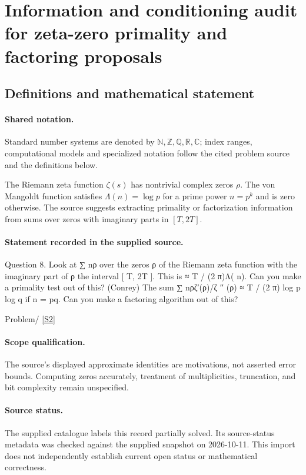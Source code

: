 \documentclass[11pt]{article}
\newcommand{\sref}[2]{\hyperlink{source:#1:#2}{[S#2]}}
\begin{document}
\section{Information and conditioning audit for zeta-zero primality and factoring proposals}\label{statement}

\subsection{Definitions and mathematical statement}

\paragraph{Shared notation.}Standard number systems are denoted by $\mathbb N,\mathbb Z,\mathbb Q,\mathbb R,\mathbb C$; index ranges, computational models and specialized notation follow the cited problem source and the definitions below.


The Riemann zeta function $\zeta(s)$ has nontrivial complex zeros $\rho$. The von Mangoldt function satisfies $\Lambda(n)=\log p$ for a prime power $n=p^k$ and is zero otherwise. The source suggests extracting primality or factorization information from sums over zeros with imaginary parts in $[T,2T]$.
\paragraph{Statement recorded in the supplied source.}
Question 8. Look at ∑ nρ over the zeros ρ of the Riemann zeta function with the imaginary part of ρ the interval [ T, 2T ]. This is ≈ T / (2 π)Λ( n). Can you make a primality test out of this? (Conrey) The sum ∑ nρζ′(ρ)/ζ ′′ (ρ) ≈ T / (2 π) log p log q if n = pq. Can you make a factoring algorithm out of this?

Problem/ \sref{statement}{2}
\paragraph{Scope qualification.}
The source's displayed approximate identities are motivations, not asserted error bounds. Computing zeros accurately, treatment of multiplicities, truncation, and bit complexity remain unspecified.
\paragraph{Source status.}
The supplied catalogue labels this record partially solved. Its source-status metadata was checked against the supplied snapshot on 2026-10-11. This import does not independently establish current open status or mathematical correctness.
\end{document}
